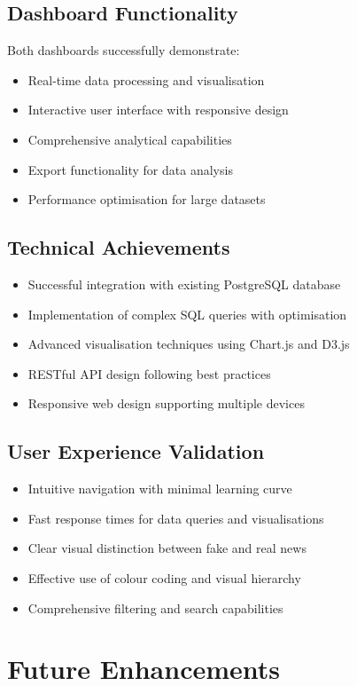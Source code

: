 \documentclass[12pt,a4paper]{article}
\begin{document}
\subsection{Dashboard Functionality}
Both dashboards successfully demonstrate:
\begin{itemize}
    \item Real-time data processing and visualisation
    \item Interactive user interface with responsive design
    \item Comprehensive analytical capabilities
    \item Export functionality for data analysis
    \item Performance optimisation for large datasets
\end{itemize}

\subsection{Technical Achievements}
\begin{itemize}
    \item Successful integration with existing PostgreSQL database
    \item Implementation of complex SQL queries with optimisation
    \item Advanced visualisation techniques using Chart.js and D3.js
    \item RESTful API design following best practices
    \item Responsive web design supporting multiple devices
\end{itemize}

\subsection{User Experience Validation}
\begin{itemize}
    \item Intuitive navigation with minimal learning curve
    \item Fast response times for data queries and visualisations
    \item Clear visual distinction between fake and real news
    \item Effective use of colour coding and visual hierarchy
    \item Comprehensive filtering and search capabilities
\end{itemize}

\section{Future Enhancements}
\end{document}
